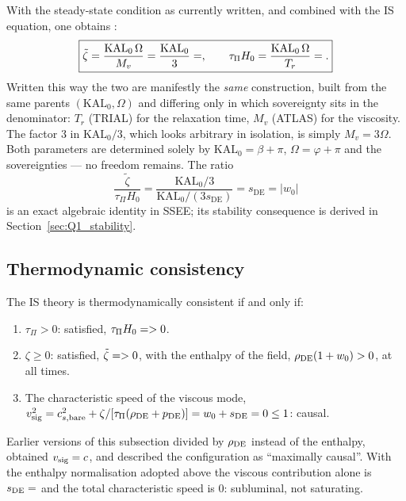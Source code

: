 \documentclass[12pt,a4paper]{article}
\newcommand{\KALz}{\mathrm{KAL}_0}
\newcommand{\wz}{w_0}
\newcommand{\sDE}{s_{\mathrm{DE}}}
\newcommand{\tauPi}{\tau_\Pi}
\newcommand{\ztilde}{\tilde{\zeta}}
\begin{document}
\noindent With the steady-state condition as currently written, and combined
with the IS equation, one obtains \citep{SSEE_Paper1}:
\begin{equation}
  \boxed{\ztilde = \frac{\KALz\,\Omega}{M_v} = \frac{\KALz}{3} = \val{zeta_tilde_d4},
  \qquad
  \tauPi H_0 = \frac{\KALz\,\Omega}{T_r} = \val{TAU_PI_H0_d4}.}
  \label{eq:IS_params}
\end{equation}
Written this way the two are manifestly the \emph{same} construction, built
from the same parents $(\KALz,\Omega)$ and differing only in which sovereignty
sits in the denominator: $T_r$ (TRIAL) for the relaxation time, $M_v$ (ATLAS)
for the viscosity. The factor $3$ in $\KALz/3$, which looks arbitrary in
isolation, is simply $M_v = 3\Omega$. Both parameters are determined solely by
$\KALz = \beta+\pi$, $\Omega=\varphi+\pi$ and the sovereignties — no freedom
remains.
The ratio
\begin{equation}
  \frac{\ztilde}{\tauPi H_0} = \frac{\KALz/3}{\KALz/(3\sDE)} = \sDE = |\wz|
  \label{eq:ratio_identity}
\end{equation}
is an exact algebraic identity in SSEE; its stability consequence is derived
in Section~\ref{sec:Q1_stability}.

\subsection{Thermodynamic consistency}
\label{subsec:thermodynamic}

The IS theory is thermodynamically consistent if and only if:
\begin{enumerate}[label=(\roman*)]
  \item $\tauPi > 0$: satisfied, $\tauPi H_0 = \val{TAU_PI_H0_d3} > 0$.
  \item $\zeta \geq 0$: satisfied, $\ztilde = \val{zeta_tilde_d4} > 0$, with the
    enthalpy of the field, $\rho_{\rm DE}(1+\wz)>0$, at all times.
  \item The characteristic speed of the viscous mode,
    $v^2_{\rm sig} = c^2_{s,\rm bare} + \zeta/[\tauPi(\rho_{\mathrm{DE}}+p_{\mathrm{DE}})]
    = \wz + \sDE = 0 \leq 1$: causal.
\end{enumerate}
Earlier versions of this subsection divided by $\rho_{\rm DE}$ instead of the
enthalpy, obtained $v_{\rm sig}=c$, and described the configuration as
``maximally causal''. With the enthalpy normalisation adopted above the viscous
contribution alone is $\sDE=\val{S_DE_d6}$ and the total characteristic speed is
$0$: subluminal, not saturating.
\end{document}
